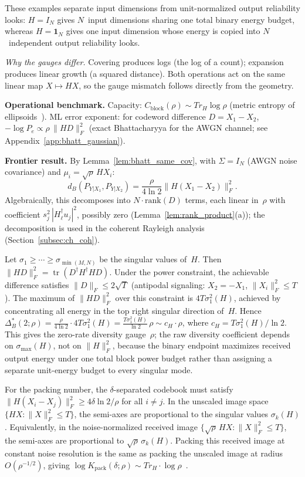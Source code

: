 \documentclass[lettersize,onecolumn]{IEEEtran}
\newcommand{\snr}{\rho}
\DeclareMathOperator{\tr}{tr}
\begin{document}
These examples separate input dimensions from unit-normalized output
reliability looks: $H = I_N$ gives $N$~input dimensions sharing one
total binary energy budget, whereas $H = \mathbf{1}_N$ gives one
input dimension whose energy is copied into $N$~independent output
reliability looks.

\emph{Why the gauges differ.}
Covering produces logs (the log of a count); expansion produces
linear growth (a squared distance). Both operations act on the
same linear map $X \mapsto HX$, so the gauge mismatch follows
directly from the geometry.

\textbf{Operational benchmark.}
Capacity: $C_{\mathrm{block}}(\snr) \sim Tr_H\log\snr$
(metric entropy of
ellipsoids~\cite{KolmogorovTikhomirov1959}). ML error exponent:
for codeword difference $D = X_1 - X_2$,
$-\log P_e \propto \snr\,\|HD\|_F^2$ (exact Bhattacharyya
for the AWGN channel; see Appendix~\ref{app:bhatt_gaussian}).

\textbf{Frontier result.}
By Lemma~\ref{lem:bhatt_same_cov}, with
$\Sigma = I_N$ (AWGN noise covariance) and
$\mu_i = \sqrt{\snr}\,H X_i$:
\begin{equation}\label{eq:bhatt_det}
d_B(P_{Y|X_1},P_{Y|X_2})
= \frac{\snr}{4\ln 2}\|H(X_1-X_2)\|_F^2.
\end{equation}
Algebraically, this decomposes into $N\!\cdot\!\mathrm{rank}(D)$
terms, each linear in~$\snr$ with coefficient
$s_j^2\,|H_\ell^\dagger u_j|^2$, possibly zero
(Lemma~\ref{lem:rank_product}(a)); the decomposition is used in
the coherent Rayleigh analysis (Section~\ref{subsec:ch_coh}).

Let $\sigma_1 \ge \cdots \ge \sigma_{\min(M,N)}$
be the singular values of~$H$. Then
$\|HD\|_F^2 = \tr(D^\dagger H^\dagger H D)$.
Under the power constraint, the achievable difference satisfies
$\|D\|_F \le 2\sqrt{T}$ (antipodal signaling: $X_2 = -X_1$,
$\|X_i\|_F^2 \le T$). The maximum of $\|HD\|_F^2$ over this
constraint is $4T\sigma_1^2(H)$, achieved by concentrating all
energy in the top right singular direction of~$H$. Hence
$\Delta_B^*(2;\snr) = \frac{\snr}{4\ln 2}\cdot
4T\sigma_1^2(H) = \frac{T\sigma_1^2(H)}{\ln 2}\,\snr
\sim c_H\cdot\snr$,
where $c_H = T\sigma_1^2(H)/\ln 2$. This gives the zero-rate
diversity gauge~$\snr$; the raw diversity coefficient depends on $\sigma_{\max}(H)$, not on
$\|H\|_F^2$, because the binary endpoint maximizes received output
energy under one total block power budget rather than assigning a
separate unit-energy budget to every singular mode.

For the packing number, the $\delta$-separated codebook must satisfy
$\|H(X_i - X_j)\|_F^2 \ge 4\delta\ln 2/\snr$ for all $i\ne j$.
In the unscaled image space $\{HX : \|X\|_F^2 \le T\}$, the
semi-axes are proportional to the singular values $\sigma_k(H)$.
Equivalently, in the noise-normalized received image
$\{\sqrt{\snr}\,HX : \|X\|_F^2 \le T\}$, the semi-axes are
proportional to $\sqrt{\snr}\,\sigma_k(H)$. Packing this received
image at constant noise resolution is the same as packing the
unscaled image at radius $O(\snr^{-1/2})$, giving
$\log K_{\mathrm{pack}}(\delta;\snr) \sim
Tr_H\cdot\log\snr$~\cite{KolmogorovTikhomirov1959}.
\end{document}
